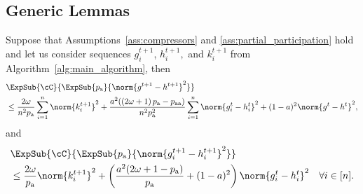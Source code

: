 \documentclass{article}
\newcommand*{\probavailable}{\ensuremath{p_{\textnormal{a}}}}
\newcommand*{\probpairaa}{\ensuremath{p_{\textnormal{aa}}}}
\begin{document}
\subsection{Generic Lemmas}
\begin{lemma}
  \label{lemma:g_h}
  Suppose that Assumptions~\ref{ass:compressors} and \ref{ass:partial_participation} hold and let us consider sequences $g^{t+1}_i$, $h^{t+1}_i,$ and $k^{t+1}_i$ from Algorithm~\ref{alg:main_algorithm}, then
  \begin{align}
      \label{eq:compressor_global_error}
      &\ExpSub{\cC}{\ExpSub{\probavailable}{\norm{g^{t+1} - h^{t+1}}^2}} \nonumber \\
      &\leq \frac{2 \omega}{n^2 \probavailable}\sum_{i=1}^n\norm{k^{t+1}_i}^2 +\frac{a^2 (\left(2 \omega + 1\right)\probavailable - \probpairaa)}{n^2 \probavailable^2}\sum_{i=1}^n\norm{g^{t}_i - h^{t}_i}^2 + (1 - a)^2\norm{g^{t} - h^{t}}^2,
  \end{align}
  and
  \begin{align}
      \label{eq:compressor_local_error}
      &\ExpSub{\cC}{\ExpSub{\probavailable}{\norm{g^{t+1}_i - h^{t+1}_i}^2}} \nonumber \\
      &\leq \frac{2 \omega}{\probavailable}\norm{k^{t+1}_i}^2 + \left(\frac{a^2(2\omega + 1 - \probavailable)}{\probavailable} + (1 - a)^2\right)\norm{g^{t}_i - h^{t}_i}^2\quad \forall i \in [n].
  \end{align}
\end{lemma}
\end{document}

